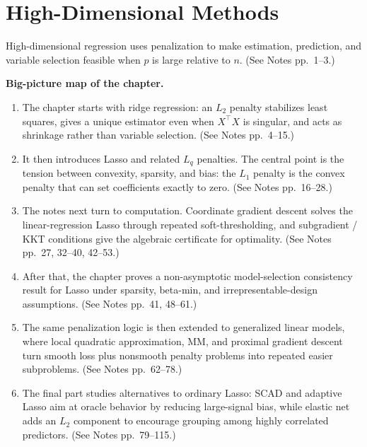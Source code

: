 \section{High-Dimensional Methods}

High-dimensional regression uses penalization to make estimation, prediction, and variable selection feasible when $p$ is large relative to $n$. (See Notes pp.~1--3.)

\begin{block}
\textbf{Big-picture map of the chapter.}
\begin{enumerate}
    \item The chapter starts with ridge regression: an $L_2$ penalty stabilizes least squares, gives a unique estimator even when $X^\top X$ is singular, and acts as shrinkage rather than variable selection. (See Notes pp.~4--15.)
    \item It then introduces Lasso and related $L_q$ penalties. The central point is the tension between convexity, sparsity, and bias: the $L_1$ penalty is the convex penalty that can set coefficients exactly to zero. (See Notes pp.~16--28.)
    \item The notes next turn to computation. Coordinate gradient descent solves the linear-regression Lasso through repeated soft-thresholding, and subgradient / KKT conditions give the algebraic certificate for optimality. (See Notes pp.~27, 32--40, 42--53.)
    \item After that, the chapter proves a non-asymptotic model-selection consistency result for Lasso under sparsity, beta-min, and irrepresentable-design assumptions. (See Notes pp.~41, 48--61.)
    \item The same penalization logic is then extended to generalized linear models, where local quadratic approximation, MM, and proximal gradient descent turn smooth loss plus nonsmooth penalty problems into repeated easier subproblems. (See Notes pp.~62--78.)
    \item The final part studies alternatives to ordinary Lasso: SCAD and adaptive Lasso aim at oracle behavior by reducing large-signal bias, while elastic net adds an $L_2$ component to encourage grouping among highly correlated predictors. (See Notes pp.~79--115.)
\end{enumerate}
\end{block}

